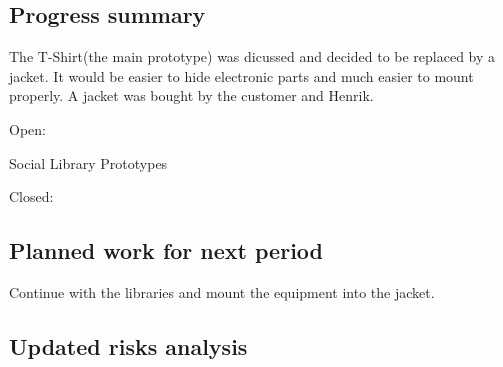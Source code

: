 \subsection{Progress summary}

The T-Shirt(the main prototype) was dicussed and decided to be replaced by a jacket. It would be easier to hide electronic parts and much easier to mount properly. A jacket was bought by the customer and Henrik.

Open:

Social Library
Prototypes

Closed:

\subsection{Planned work for next period}

Continue with the libraries and mount the equipment into the jacket. 

\subsection{Updated risks analysis}
